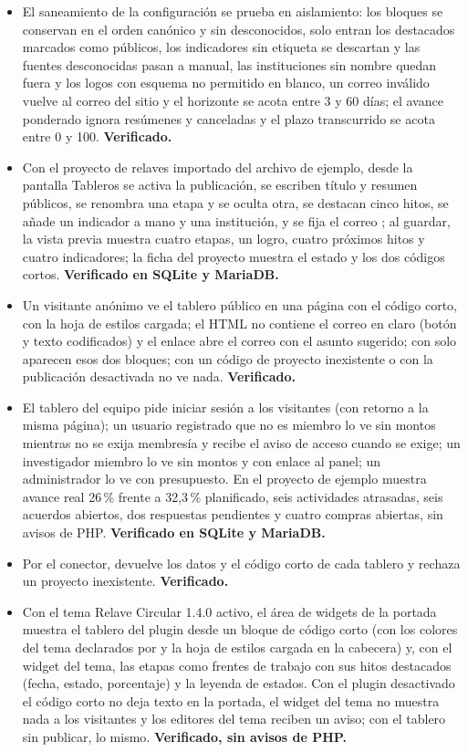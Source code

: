 \documentclass[11pt,a4paper]{article}
\begin{document}
\begin{itemize}
\item El saneamiento de la configuración se prueba en aislamiento: los bloques se conservan en el orden canónico y sin desconocidos, solo entran los destacados marcados como públicos, los indicadores sin etiqueta se descartan y las fuentes desconocidas pasan a manual, las instituciones sin nombre quedan fuera y los logos con esquema no permitido en blanco, un correo inválido vuelve al correo del sitio y el horizonte se acota entre 3 y 60 días; el avance ponderado ignora resúmenes y canceladas y el plazo transcurrido se acota entre 0 y 100. \textbf{Verificado.}
\item Con el proyecto de relaves importado del archivo de ejemplo, desde la pantalla Tableros se activa la publicación, se escriben título y resumen públicos, se renombra una etapa y se oculta otra, se destacan cinco hitos, se añade un indicador a mano y una institución, y se fija el correo ; al guardar, la vista previa muestra cuatro etapas, un logro, cuatro próximos hitos y cuatro indicadores; la ficha del proyecto muestra el estado y los dos códigos cortos. \textbf{Verificado en SQLite y MariaDB.}
\item Un visitante anónimo ve el tablero público en una página con el código corto, con la hoja de estilos cargada; el HTML no contiene el correo en claro (botón y texto codificados) y el enlace abre el correo con el asunto sugerido; con  solo aparecen esos dos bloques; con un código de proyecto inexistente o con la publicación desactivada no ve nada. \textbf{Verificado.}
\item El tablero del equipo pide iniciar sesión a los visitantes (con retorno a la misma página); un usuario registrado que no es miembro lo ve sin montos mientras no se exija membresía y recibe el aviso de acceso cuando se exige; un investigador miembro lo ve sin montos y con enlace al panel; un administrador lo ve con presupuesto. En el proyecto de ejemplo muestra avance real 26\,\% frente a 32,3\,\% planificado, seis actividades atrasadas, seis acuerdos abiertos, dos respuestas pendientes y cuatro compras abiertas, sin avisos de PHP. \textbf{Verificado en SQLite y MariaDB.}
\item Por el conector,  devuelve los datos y el código corto de cada tablero y rechaza un proyecto inexistente. \textbf{Verificado.}
\item Con el tema Relave Circular 1.4.0 activo, el área de widgets de la portada muestra el tablero del plugin desde un bloque de código corto (con los colores del tema declarados por  y la hoja de estilos cargada en la cabecera) y, con el widget del tema, las etapas como frentes de trabajo con sus hitos destacados (fecha, estado, porcentaje) y la leyenda de estados. Con el plugin desactivado el código corto no deja texto en la portada, el widget del tema no muestra nada a los visitantes y los editores del tema reciben un aviso; con el tablero sin publicar, lo mismo. \textbf{Verificado, sin avisos de PHP.}
\end{itemize}
\end{document}
